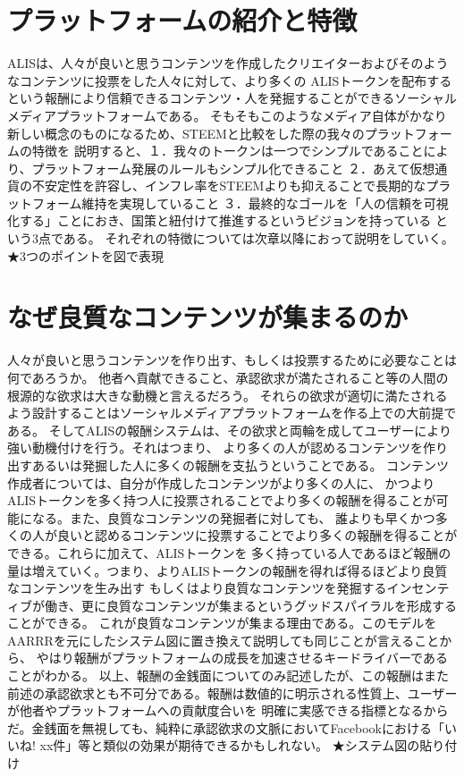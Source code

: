 \documentclass{jsarticle}
\begin{document}
\section{プラットフォームの紹介と特徴}
ALISは、人々が良いと思うコンテンツを作成したクリエイターおよびそのようなコンテンツに投票をした人々に対して、より多くの
ALISトークンを配布するという報酬により信頼できるコンテンツ・人を発掘することができるソーシャルメディアプラットフォームである。
そもそもこのようなメディア自体がかなり新しい概念のものになるため、STEEMと比較をした際の我々のプラットフォームの特徴を
説明すると、１．我々のトークンは一つでシンプルであることにより、プラットフォーム発展のルールもシンプル化できること
２．あえて仮想通貨の不安定性を許容し、インフレ率をSTEEMよりも抑えることで長期的なプラットフォーム維持を実現していること
３．最終的なゴールを「人の信頼を可視化する」ことにおき、国策と紐付けて推進するというビジョンを持っている という3点である。
それぞれの特徴については次章以降におって説明をしていく。
★3つのポイントを図で表現
\section{なぜ良質なコンテンツが集まるのか}
人々が良いと思うコンテンツを作り出す、もしくは投票するために必要なことは何であろうか。  
他者へ貢献できること、承認欲求が満たされること等の人間の根源的な欲求は大きな動機と言えるだろう。
それらの欲求が適切に満たされるよう設計することはソーシャルメディアプラットフォームを作る上での大前提である。
そしてALISの報酬システムは、その欲求と両輪を成してユーザーにより強い動機付けを行う。それはつまり、
より多くの人が認めるコンテンツを作り出すあるいは発掘した人に多くの報酬を支払うということである。
コンテンツ作成者については、自分が作成したコンテンツがより多くの人に、
かつよりALISトークンを多く持つ人に投票されることでより多くの報酬を得ることが可能になる。また、良質なコンテンツの発掘者に対しても、
誰よりも早くかつ多くの人が良いと認めるコンテンツに投票することでより多くの報酬を得ることができる。これらに加えて、ALISトークンを
多く持っている人であるほど報酬の量は増えていく。つまり、よりALISトークンの報酬を得れば得るほどより良質なコンテンツを生み出す
 もしくはより良質なコンテンツを発掘するインセンティブが働き、更に良質なコンテンツが集まるというグッドスパイラルを形成することができる。
 これが良質なコンテンツが集まる理由である。このモデルをAARRRを元にしたシステム図に置き換えて説明しても同じことが言えることから、
 やはり報酬がプラットフォームの成長を加速させるキードライバーであることがわかる。
 以上、報酬の金銭面についてのみ記述したが、この報酬はまた前述の承認欲求とも不可分である。報酬は数値的に明示される性質上、ユーザーが他者やプラットフォームへの貢献度合いを
明確に実感できる指標となるからだ。金銭面を無視しても、純粋に承認欲求の文脈においてFacebookにおける「いいね! xx件」等と類似の効果が期待できるかもしれない。
 ★システム図の貼り付け
\end{document}
